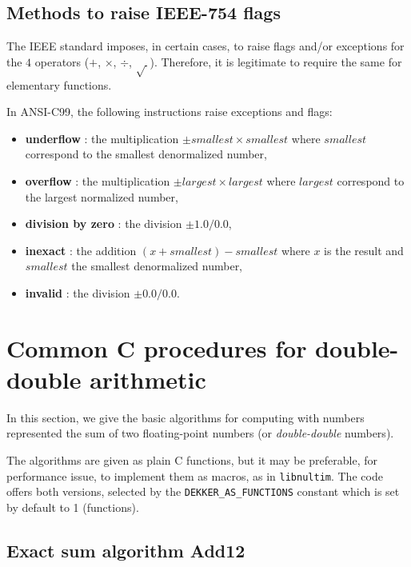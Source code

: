 \subsection{Methods to raise IEEE-754 flags}

The IEEE standard imposes, in certain cases, to raise flags and/or
exceptions for the $4$ operators ($+$, $\times$, $\div$, $\sqrt{~}$).
Therefore, it is legitimate to require the same for elementary
functions.

In ANSI-C99, the following instructions raise exceptions and
flags:

\begin{itemize}
\item {\bf underflow} : the multiplication $\pm smallest \times smallest$ where $smallest$ correspond to the smallest denormalized number,
\item {\bf overflow} : the multiplication  $\pm largest \times largest$ where $largest$ correspond to the largest normalized number,
\item {\bf division by zero} : the division $\pm 1.0/0.0$,
\item {\bf inexact} : the addition $(x + smallest) - smallest$ where $x$ is the result and  $smallest$ the smallest denormalized number,
\item {\bf invalid} : the division $\pm 0.0/0.0$.
\end{itemize}








\section{Common C procedures for double-double arithmetic\label{section:commonCdoubledouble}}

In this section, we give the basic algorithms for computing with
numbers represented the sum of two floating-point numbers (or
\emph{double-double} numbers). 

The algorithms are given as plain C functions, but it may be
preferable, for performance issue, to implement them as macros, as in
\texttt{libnultim}.  The code offers both versions,
selected by the \texttt{DEKKER\_AS\_FUNCTIONS} constant which is set
by default to 1 (functions).


\subsection{Exact sum algorithm {Add12}}

